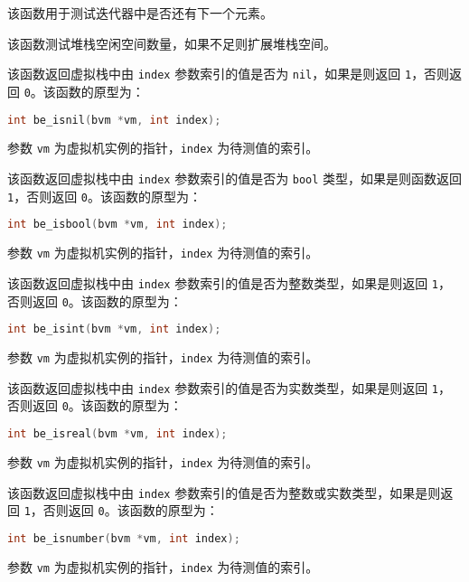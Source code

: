 
该函数用于测试迭代器中是否还有下一个元素。





该函数测试堆栈空闲空间数量，如果不足则扩展堆栈空间。


该函数返回虚拟栈中由 \texttt{index} 参数索引的值是否为 \texttt{nil}，如果是则返回 \texttt{1}，否则返回 \texttt{0}。该函数的原型为：
\begin{lstlisting}[language=c, style=berry, numbers=none]
int be_isnil(bvm *vm, int index);
\end{lstlisting}
参数 \texttt{vm} 为虚拟机实例的指针，\texttt{index} 为待测值的索引。


该函数返回虚拟栈中由 \texttt{index} 参数索引的值是否为 \texttt{bool} 类型，如果是则函数返回 \texttt{1}，否则返回 \texttt{0}。该函数的原型为：
\begin{lstlisting}[language=c, style=berry, numbers=none]
int be_isbool(bvm *vm, int index);
\end{lstlisting}
参数 \texttt{vm} 为虚拟机实例的指针，\texttt{index} 为待测值的索引。


该函数返回虚拟栈中由 \texttt{index} 参数索引的值是否为整数类型，如果是则返回 \texttt{1}，否则返回 \texttt{0}。该函数的原型为：
\begin{lstlisting}[language=c, style=berry, numbers=none]
int be_isint(bvm *vm, int index);
\end{lstlisting}
参数 \texttt{vm} 为虚拟机实例的指针，\texttt{index} 为待测值的索引。


该函数返回虚拟栈中由 \texttt{index} 参数索引的值是否为实数类型，如果是则返回 \texttt{1}，否则返回 \texttt{0}。该函数的原型为：
\begin{lstlisting}[language=c, style=berry, numbers=none]
int be_isreal(bvm *vm, int index);
\end{lstlisting}
参数 \texttt{vm} 为虚拟机实例的指针，\texttt{index} 为待测值的索引。


该函数返回虚拟栈中由 \texttt{index} 参数索引的值是否为整数或实数类型，如果是则返回 \texttt{1}，否则返回 \texttt{0}。该函数的原型为：
\begin{lstlisting}[language=c, style=berry, numbers=none]
int be_isnumber(bvm *vm, int index);
\end{lstlisting}
参数 \texttt{vm} 为虚拟机实例的指针，\texttt{index} 为待测值的索引。

